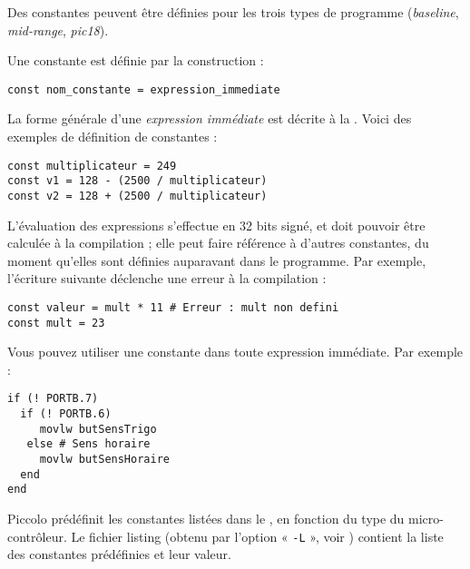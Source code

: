 
\cleardoublepage


\thispagestyle{empty}

Des constantes peuvent être définies pour les trois types de programme (\emph{baseline}, \emph{mid-range}, \emph{pic18}).

Une constante est définie par la construction :

\begin{lstlisting}[language=piccolo]
const nom_constante = expression_immediate
\end{lstlisting}


La forme générale d’une \emph{expression immédiate} est décrite à la . Voici des exemples de définition de constantes :

\begin{lstlisting}[language=piccolo]
const multiplicateur = 249
const v1 = 128 - (2500 / multiplicateur)
const v2 = 128 + (2500 / multiplicateur)
\end{lstlisting}

L’évaluation des expressions s’effectue en 32 bits signé, et doit pouvoir être calculée à la compilation ; elle peut faire référence à d’autres constantes, du moment qu’elles sont définies auparavant dans le programme. Par exemple, l’écriture suivante déclenche une erreur à la compilation :

\begin{lstlisting}[language=piccolo]
const valeur = mult * 11 # Erreur : mult non defini
const mult = 23 
\end{lstlisting}

Vous pouvez utiliser une constante dans toute expression immédiate. Par exemple :

\begin{lstlisting}[language=piccolo]
if (! PORTB.7)
  if (! PORTB.6)
     movlw butSensTrigo
   else # Sens horaire
     movlw butSensHoraire
  end
end
\end{lstlisting}



Piccolo prédéfinit les constantes listées dans le , en fonction du type du micro-contrôleur. Le fichier listing (obtenu par l'option « \texttt{-L} », voir ) contient la liste des constantes prédéfinies et leur valeur.

